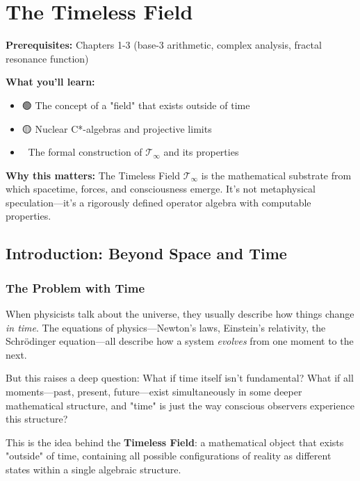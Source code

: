 \chapter{The Timeless Field}
\label{ch:timeless-field}

\begin{chapterobjectives}
\textbf{Prerequisites:} Chapters 1-3 (base-3 arithmetic, complex analysis, fractal resonance function)

\textbf{What you'll learn:}
\begin{itemize}
\item 🟢 The concept of a "field" that exists outside of time
\item 🟡 Nuclear C*-algebras and projective limits
\item 🔴 The formal construction of $\mathcal{T}_\infty$ and its properties
\end{itemize}

\textbf{Why this matters:} The Timeless Field $\mathcal{T}_\infty$ is the mathematical substrate from which spacetime, forces, and consciousness emerge. It's not metaphysical speculation—it's a rigorously defined operator algebra with computable properties.
\end{chapterobjectives}

\section{Introduction: Beyond Space and Time}
\label{sec:beyond-spacetime}

\subsection{The Problem with Time}


\begin{intuitive}
When physicists talk about the universe, they usually describe how things change \textit{in time}. The equations of physics—Newton's laws, Einstein's relativity, the Schrödinger equation—all describe how a system \textit{evolves} from one moment to the next.

But this raises a deep question: What if time itself isn't fundamental? What if all moments—past, present, future—exist simultaneously in some deeper mathematical structure, and "time" is just the way conscious observers experience this structure?

This is the idea behind the \textbf{Timeless Field}: a mathematical object that exists "outside" of time, containing all possible configurations of reality as different states within a single algebraic structure.
\end{intuitive}

